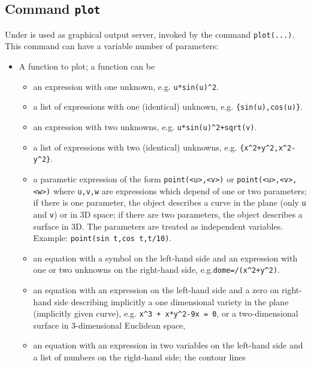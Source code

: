\subsection{Command \texttt{plot}}

Under {\REDUCE} {\Gnuplot} is used as graphical output server, invoked by the
command \texttt{plot(...)}.  This command can have a variable number of
parameters:
\begin{itemize}
\item A function to plot; a function can be
  \begin{itemize}
    \item an expression with one unknown, e.g. \texttt{u*sin(u)\^{}2}.
    \item a list of expressions with one (identical) unknown,
      e.g. \texttt{\{sin(u),\allowbreak cos(u)\}}.
    \item an expression with two unknowns, e.g. \texttt{u*sin(u)\^{}2+sqrt(v)}.
    \item a list of expressions with two (identical) unknowns,
      e.g. \linebreak
      \texttt{\{x\textasciicircum{2}+y\textasciicircum{2},\allowbreak x\textasciicircum{2}-y\textasciicircum{2}\}}.
    \item a parametic expression of the form \texttt{point(<u>,<v>)} or
      \texttt{point(<u>,\allowbreak <v>,<w>)} where \texttt{u,v,w} are
      expressions which depend of one or two parameters; if there is one
      parameter, the object describes a curve in the plane (only \texttt{u} and
      \texttt{v}) or in 3D space; if there are two parameters, the object
      describes a surface in 3D. The parameters are treated as independent
      variables.  Example: \texttt{point(sin t,cos t,t/10)}.
    \item an equation with a symbol on the left-hand side and an expression with
      one or two unknowns on the right-hand side, e.g.\linebreak[3]
      \texttt{dome=/(x\^{}2+y\^{}2)}.
    \item an equation with an expression on the left-hand side and a zero on
      right-hand side describing implicitly a one dimensional variety in the
      plane (implicitly given curve), e.g. 
      \texttt{x\^{}3 + x*y\^{}2-9x = 0}, or a
      two-dimensional surface in 3-dimensional Euclidean space,
    \item an equation with an expression in two variables on the left-hand side
      and a list of numbers on the right-hand side; the contour lines

\end{itemize}
\end{itemize}
